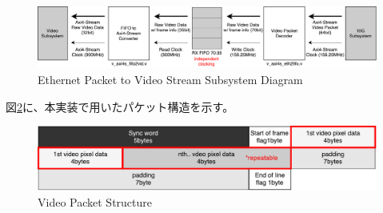 \begin{figure}[htbp]
    \begin{center}
        \includegraphics[bb=0 0 911 166,width=15.5cm]{img/fpga-ethernet-video-diagram.pdf}
    \end{center}
    \caption{Ethernet Packet to Video Stream Subsystem Diagram}
    \label{fig:fpga-ethernet-video-diagram}
\end{figure}

図\ref{fig:fpga-video-packet}に、本実装で用いたパケット構造を示す。

\begin{figure}[htbp]
    \begin{center}
        \includegraphics[bb=0 0 643 122,width=15.5cm]{img/fpga-video-packet.pdf}
    \end{center}
    \caption{Video Packet Structure}
    \label{fig:fpga-video-packet}
\end{figure}
